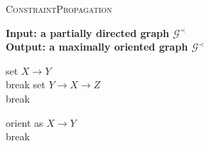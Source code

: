 \begin{algorithm}[H]
\caption{\textsc{ConstraintPropagation}}
\label{algor:consProp}
\textbf{Input: a partially directed graph $\mathcal{G}^\prec$}\\
\textbf{Output: a maximally oriented graph $\mathcal{G}^\prec$}\\\vspace{-4mm}
	\begin{algorithmic}[1]
						\STATE set $X\rightarrow Y$ \\  
						\STATE break	
					\ENDIF					
					\STATE set $Y\rightarrow X\rightarrow Z$ \\ 
					\STATE break					
				\ENDIF		
					
					\STATE orient as $X\rightarrow Y$ \\
					\STATE break  	
				\ENDIF
		\ENDWHILE	
	\end{algorithmic}
\end{algorithm}